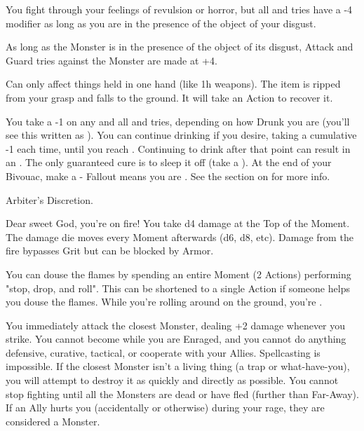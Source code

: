 \begin{multicols*}{2}
  You fight through your feelings of revulsion or horror, but all \RO and \RB tries have a -4 modifier as long as you are in the presence of the object of your disgust.

   As long as the Monster is in the presence of the object of its disgust, Attack and Guard tries against the Monster are made at +4.


  Can only affect things held in one hand (like 1h weapons). The item is ripped from your grasp and falls to the ground.  It will take an Action to recover it.

  
  You take a -1 on any and all \RO and \RB tries, depending on how Drunk you are (you'll see this written as ).  You can continue drinking if you desire, taking a cumulative -1 each time, until you reach . Continuing to drink after that point can result in an .  The only guaranteed cure is to sleep it off (take a ).  At the end of your Bivouac, make a \RSTRY{\VIG} - Fallout means you are . See the section on  for more info. 

    Arbiter's Discretion.


  Dear sweet God, you're on fire! You take d4 damage at the Top of the Moment. The damage die moves \DCUP every Moment afterwards (d6, d8, etc). Damage from the fire bypasses Grit but can be blocked by Armor.

You can douse the flames by spending an entire Moment (2 Actions) performing "stop, drop, and roll".  This can be shortened to a single Action if someone helps you douse the flames. While you're rolling around on the ground, you're .



  You immediately attack the closest Monster, dealing +2 damage whenever you strike. You cannot become  while you are Enraged, and you cannot do anything defensive, curative, tactical, or cooperate with your Allies. Spellcasting is impossible. If the closest Monster isn't a living thing (a trap or what-have-you), you will attempt to destroy it as quickly and directly as possible. You cannot stop fighting until all the Monsters are dead or have fled (further than Far-Away).  If an Ally hurts you (accidentally or otherwise) during your rage, they are considered a Monster.


\end{multicols*}
